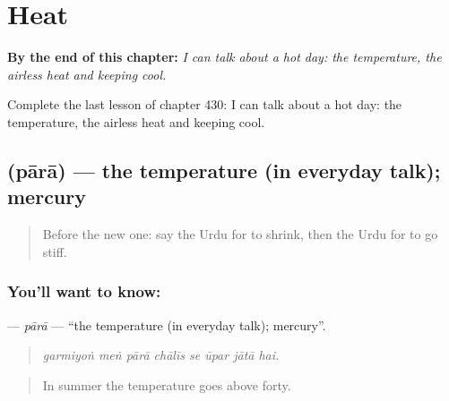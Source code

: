 
\chapter{Heat}
\label{ch:ur-heat}

\begin{chapteropening}
\textbf{By the end of this chapter:} \emph{I can talk about a hot day: the temperature, the airless heat and keeping cool.}

Complete the last lesson of chapter 430: I can talk about a hot day: the temperature, the airless heat and keeping cool.
\end{chapteropening}

\section[\texorpdfstring{\ur{پارہ} (pārā)}{پارہ (pārā)}]{ (pārā) — the temperature (in everyday talk); mercury}

\label{lesson:UR-C430-para}



\begin{quote}
Before the new one: say the Urdu for to shrink, then the Urdu for to go stiff.
\end{quote}

\subsection*{You'll want to know: }
\textbf{} — \emph{pārā} — \textquotedblleft{}the temperature (in everyday talk); mercury\textquotedblright{}.

\begin{quote}
       
\end{quote}

\begin{quote}
\emph{garmiyoṅ meṅ pārā chālīs se ūpar jātā hai.}
\end{quote}

\begin{quote}
In summer the temperature goes above forty.
\end{quote}

